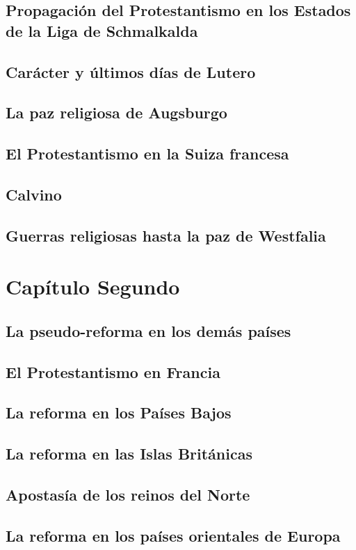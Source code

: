\raggedbottom{} \documentclass[12pt, a4paper, openany]{book} %
\begin{document}
\section{Propagación del Protestantismo en los Estados de la Liga de Schmalkalda}
\section{Carácter y últimos días de Lutero}
\section{La paz religiosa de Augsburgo}
\section{El Protestantismo en la Suiza francesa}
\section{Calvino}
\section{Guerras religiosas hasta la paz de Westfalia}
\chapter{Capítulo Segundo}
\section{La pseudo-reforma en los demás países}
\section{El Protestantismo en Francia}
\section{La reforma en los Países Bajos}
\section{La reforma en las Islas Británicas}
\section{Apostasía de los reinos del Norte}
\section{La reforma en los países orientales de Europa}
\end{document}
